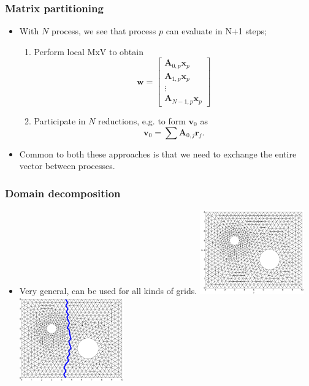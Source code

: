 \documentclass{beamer}
\begin{document}
\begin{frame}\frametitle{Matrix partitioning}
\begin{itemize}
  \item With $N$ process, we see that process $p$ can evaluate in N+1 steps;
  \begin{enumerate}
    \item Perform local MxV to obtain
        \[
          \mathbf{w} = \begin{bmatrix}
                          \mathbf{A}_{0,p}\mathbf{x}_p \\
                          \mathbf{A}_{1,p}\mathbf{x}_p \\
                          \vdots \\
                          \mathbf{A}_{N-1,p}\mathbf{x}_p
                       \end{bmatrix}
        \]
     \item Participate in $N$ reductions, e.g. to form $\mathbf{v}_0$ as
      \[
          \mathbf{v}_0 = \sum \mathbf{A}_{0,j}\mathbf{r}_j.
      \]
  \end{enumerate}
  \item Common to both these approaches is that we need to exchange the entire vector between processes.
\end{itemize}
\end{frame}
\begin{frame}\frametitle{Domain decomposition}
\begin{itemize}
  \item Very general, can be used for all kinds of grids.
    \includegraphics[width=4.5cm]{grid2D_1domain}
    \includegraphics[width=4.5cm]{grid2D_2domains}
\end{itemize}
\end{frame}
\end{document}
